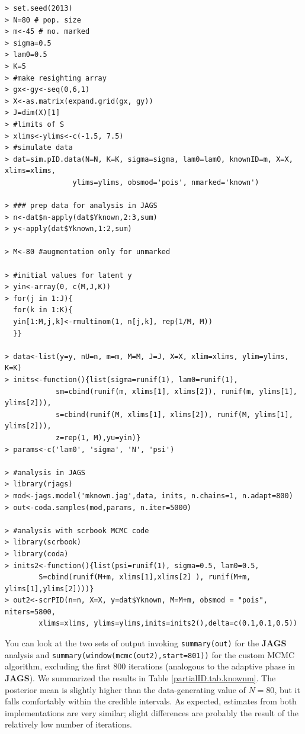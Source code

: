 {\small
\begin{verbatim}
> set.seed(2013)
> N=80 # pop. size
> m<-45 # no. marked
> sigma=0.5
> lam0=0.5
> K=5
> #make resighting array
> gx<-gy<-seq(0,6,1)
> X<-as.matrix(expand.grid(gx, gy))
> J=dim(X)[1]
> #limits of S
> xlims<-ylims<-c(-1.5, 7.5)
> #simulate data
> dat=sim.pID.data(N=N, K=K, sigma=sigma, lam0=lam0, knownID=m, X=X, xlims=xlims,
				ylims=ylims, obsmod='pois',	nmarked='known')

> ### prep data for analysis in JAGS
> n<-dat$n-apply(dat$Yknown,2:3,sum)
> y<-apply(dat$Yknown,1:2,sum)

> M<-80 #augmentation only for unmarked

> #initial values for latent y
> yin<-array(0, c(M,J,K))
> for(j in 1:J){
  for(k in 1:K){
  yin[1:M,j,k]<-rmultinom(1, n[j,k], rep(1/M, M))
  }}

> data<-list(y=y, nU=n, m=m, M=M, J=J, X=X, xlim=xlims, ylim=ylims, K=K)
> inits<-function(){list(sigma=runif(1), lam0=runif(1),
			sm=cbind(runif(m, xlims[1], xlims[2]), runif(m, ylims[1], ylims[2])),
			s=cbind(runif(M, xlims[1], xlims[2]), runif(M, ylims[1], ylims[2])),
			z=rep(1, M),yu=yin)}
> params<-c('lam0', 'sigma', 'N', 'psi')

> #analysis in JAGS
> library(rjags)
> mod<-jags.model('mknown.jag',data, inits, n.chains=1, n.adapt=800)
> out<-coda.samples(mod,params, n.iter=5000)

> #analysis with scrbook MCMC code
> library(scrbook)
> library(coda)
> inits2<-function(){list(psi=runif(1), sigma=0.5, lam0=0.5,
		S=cbind(runif(M+m, xlims[1],xlims[2] ), runif(M+m, ylims[1],ylims[2])))}
> out2<-scrPID(n=n, X=X, y=dat$Yknown, M=M+m, obsmod = "pois", niters=5800,
		xlims=xlims, ylims=ylims,inits=inits2(),delta=c(0.1,0.1,0.5))
\end{verbatim}
}
You can look at the two sets of output invoking {\tt summary(out)} for the {\bf JAGS} analysis and {\tt summary(window(mcmc(out2),start=801))} for the custom MCMC algorithm, excluding the first 800 iterations (analogous to the adaptive phase in {\bf JAGS}). %
We summarized the results in Table \ref{partialID.tab.knownm}.
The posterior mean is slightly higher than the data-generating value of $N=80$, but it falls comfortably within the credible intervals. %
As expected, estimates from both implementations are very similar; slight differences are probably the result of the relatively low number of iterations.
